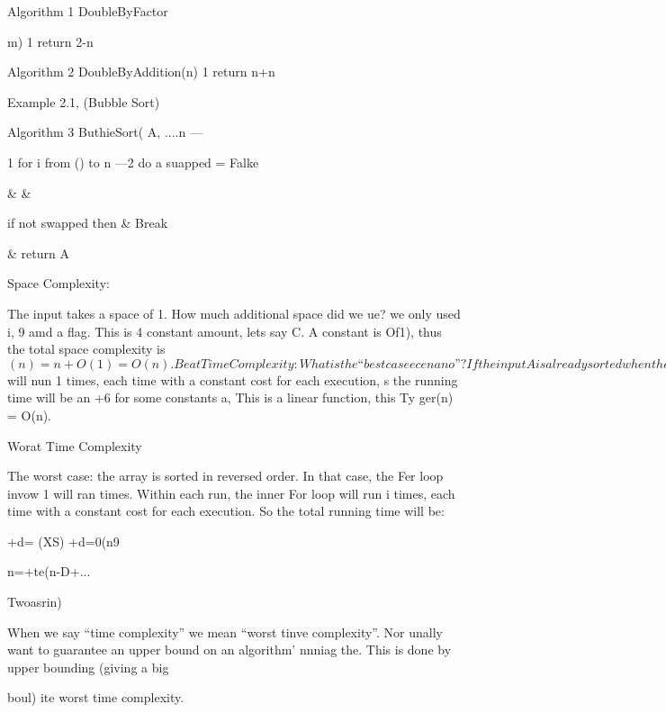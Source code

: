 {   

 

Algorithm 1 DoubleByFactor{m)
1 return 2-n

 

 

Algorithm 2 DoubleByAddition(n)
1 return n+n

 

 

Example 2.1, (Bubble Sort)
 

Algorithm 3 ButhieSort( A, ....n —

 

 

1 for i from () to n —2 do
a suapped = Falke

&
&

  

if not swapped then
& Break

& return A

 

Space Complexity:

The input takes a space of 1.
How much additional space did we ue? we only used i, 9 amd a flag. This
is 4 constant amount, lets say C. A constant is Of1), thus the total space
complexity is $(n) =n + O(1) = O(n).

 

Beat Time Complexity:

 

What is the “best case ecenano”? If the input A is already sorted when the
program starts. In this ease, the Por loop in row $ will nun 1 times, each time
with a constant cost for each execution, s the running time will be an +6 for
some constants a, This is a linear function, this Ty ger(n) = O(n).

 

 

 

Worat Time Complexity

The worst case: the array is sorted in reversed order. In that case, the Fer loop
invow 1 will ran times. Within each run, the inner For loop will run i times,
each time with a constant cost for each execution. So the total running time
will be:

+d= (XS) +d=0(n9}

n=+te(n-D+...

     

Twoasrin)

 

 

When we say “time complexity” we mean “worst tinve complexity”. Nor
unally want to guarantee an upper bound on an algorithm’ nnniag the. This
is done by upper bounding (giving a big} boul) ite worst time complexity.

